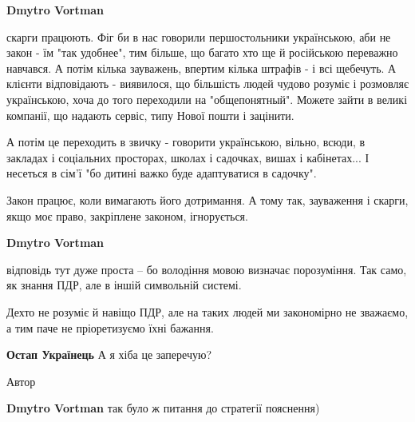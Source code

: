 \begin{itemize}
\begin{itemize}
\textbf{Dmytro Vortman} 

скарги працюють. Фіг би в нас говорили першостольники українською, аби не закон
- їм "так удобнее", тим більше, що багато хто ще й російською переважно
навчався. А потім кілька зауважень, впертим кілька штрафів - і всі щебечуть. А
клієнти відповідають - виявилося, що більшість людей чудово розуміє і розмовляє
українською, хоча до того переходили на "общепонятный". Можете зайти в великі
компанії, що надають сервіс, типу Нової пошти і зацінити.

А потім це переходить в звичку - говорити українською, вільно, всюди, в
закладах і соціальних просторах, школах і садочках, вишах і кабінетах... І
несеться в сім'ї "бо дитині важко буде адаптуватися в садочку".

Закон працює, коли вимагають його дотримання. А тому так, зауваження і скарги,
якщо моє право, закріплене законом, ігнорується.

 
\textbf{Dmytro Vortman} 

відповідь тут дуже проста – бо володіння мовою визначає порозуміння. Так само,
як знання ПДР, але в іншій символьній системі.

Дехто не розуміє й навіщо ПДР, але на таких людей ми закономірно не зважаємо, а
тим паче не пріоретизуємо їхні бажання.


 
\textbf{Остап Українець} А я хіба це заперечую?


Автор
 
\textbf{Dmytro Vortman} так було ж питання до стратегії пояснення)

 

\end{itemize}
\end{itemize}
